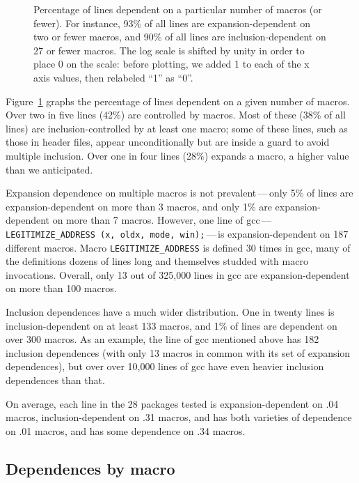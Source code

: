 \documentclass[10pt]{article}
\def\numpackageslesstwo{28}
\newcommand{\pkg}[1]{\textsf{#1}}
\newcommand{\captionsmall}[1]{\caption[]{\small #1}}
\begin{document}
\begin{figure}
\centerline{}

\captionsmall{Percentage of lines dependent on a particular number of macros (or
  fewer).  For instance, 93\% of all lines are expansion-dependent on two
  or fewer macros, and 90\% of all lines are inclusion-dependent on 27 or
  fewer macros.  The log scale is shifted by unity in order to place 0
  on the scale:  before plotting, we added 1 to each of the x axis values,
  then relabeled ``1'' as ``0''.}
\label{fig:dep-byline}
\end{figure}

Figure~\ref{fig:dep-byline} graphs the percentage of lines dependent on a
given number of macros.  Over two in five lines (42\%) are controlled by
macros.  Most of these (38\% of all lines) are inclusion-controlled by at
least one macro; some of these lines, such as those in header files, appear
unconditionally but are inside a guard to avoid multiple inclusion.  Over
one in four lines (28\%) expands a macro, a higher value than we anticipated.

Expansion dependence on multiple macros is not prevalent\,---\,only 5\% of
lines are expansion-dependent on more than 3 macros, and only 1\% are
expansion-dependent on more than 7 macros.  However, one line of
\pkg{gcc}\,---\,{\tt \verb|LEGITIMIZE_ADDRESS| (x, oldx, mode,
win);}\,---\,is expansion-dependent on 187 different macros.  Macro
\verb|LEGITIMIZE_ADDRESS| is defined 30 times in \pkg{gcc}, many of the
definitions dozens of lines long and themselves studded with macro
invocations.  Overall, only 13 out of 325,000 lines in \pkg{gcc} are
expansion-dependent on more than 100 macros.

Inclusion dependences have a much wider distribution.  One in twenty lines
is inclusion-dependent on at least 133 macros, and 1\% of lines are
dependent on over 300 macros.  As an example, the line of \pkg{gcc}
mentioned above has 182 inclusion dependences (with only 13 macros in
common with its set of expansion dependences), but over over 10,000 lines
of \pkg{gcc} have even heavier inclusion dependences than that.

On average, each line in the {\numpackageslesstwo} packages tested is
expansion-dependent on .04 macros, inclusion-dependent on .31 macros, and
has both varieties of dependence on .01 macros, and has some dependence on
.34 macros.
      

\subsection{Dependences by macro}
\end{document}
